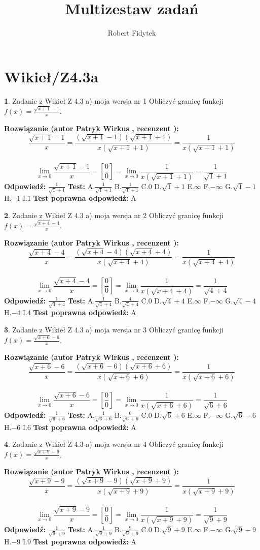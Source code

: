 \documentclass[12pt, a4paper]{article}
\title{Multizestaw zadań}
\author{Robert Fidytek}
\date{}
\theoremstyle{definition} %
\newtheorem{zad}{}
\newcommand{\kategoria}[1]{\section{#1}}
\newcommand{\zadStart}[1]{\begin{zad}#1\newline}
\newcommand{\zadStop}{\end{zad}}
\newcommand{\rozwStart}[2]{\noindent \textbf{Rozwiązanie (autor #1 , recenzent #2): }\newline}
\newcommand{\rozwStop}{\newline}
\newcommand{\odpStart}{\noindent \textbf{Odpowiedź:}\newline}
\newcommand{\odpStop}{\newline}
\newcommand{\testStart}{\noindent \textbf{Test:}\newline}
\newcommand{\testStop}{\newline}
\newcommand{\kluczStart}{\noindent \textbf{Test poprawna odpowiedź:}\newline}
\newcommand{\kluczStop}{\newline}
\begin{document}
\maketitle

\kategoria{Wikieł/Z4.3a}


\zadStart{Zadanie z Wikieł Z 4.3 a) moja wersja nr 1}
Obliczyć granicę funkcji $f(x)=\frac{\sqrt{x+1}-1}{x}$.
\zadStop
\rozwStart{Patryk Wirkus}{}
$$\frac{\sqrt{x+1}-1}{x}=\frac{(\sqrt{x+1}-1)(\sqrt{x+1}+1)}{x(\sqrt{x+1}+1)}=\frac{1}{x(\sqrt{x+1}+1)}$$
\\
$$\lim\limits_{x\to0}\frac{\sqrt{x+1}-1}{x}=[\frac{0}{0}]=
\lim\limits_{x\to0}\frac{1}{x(\sqrt{x+1}+1)} = \frac{1}{\sqrt{1}+1}$$
\rozwStop
\odpStart
$\frac{1}{\sqrt{1}+1}$
\odpStop
\testStart
A.$\frac{1}{\sqrt{1}+1}$
B.$\frac{1}{\sqrt{1}+1}$
C.$0$
D.$\sqrt{1}+1$
E.$\infty$
F.$-\infty$
G.$\sqrt{1}-1$
H.$-1$
I.$1$
\testStop
\kluczStart
A
\kluczStop



\zadStart{Zadanie z Wikieł Z 4.3 a) moja wersja nr 2}
Obliczyć granicę funkcji $f(x)=\frac{\sqrt{x+4}-4}{x}$.
\zadStop
\rozwStart{Patryk Wirkus}{}
$$\frac{\sqrt{x+4}-4}{x}=\frac{(\sqrt{x+4}-4)(\sqrt{x+4}+4)}{x(\sqrt{x+4}+4)}=\frac{1}{x(\sqrt{x+4}+4)}$$
\\
$$\lim\limits_{x\to0}\frac{\sqrt{x+4}-4}{x}=[\frac{0}{0}]=
\lim\limits_{x\to0}\frac{1}{x(\sqrt{x+4}+4)} = \frac{1}{\sqrt{4}+4}$$
\rozwStop
\odpStart
$\frac{1}{\sqrt{4}+4}$
\odpStop
\testStart
A.$\frac{1}{\sqrt{4}+4}$
B.$\frac{4}{\sqrt{4}+4}$
C.$0$
D.$\sqrt{4}+4$
E.$\infty$
F.$-\infty$
G.$\sqrt{4}-4$
H.$-4$
I.$4$
\testStop
\kluczStart
A
\kluczStop



\zadStart{Zadanie z Wikieł Z 4.3 a) moja wersja nr 3}
Obliczyć granicę funkcji $f(x)=\frac{\sqrt{x+6}-6}{x}$.
\zadStop
\rozwStart{Patryk Wirkus}{}
$$\frac{\sqrt{x+6}-6}{x}=\frac{(\sqrt{x+6}-6)(\sqrt{x+6}+6)}{x(\sqrt{x+6}+6)}=\frac{1}{x(\sqrt{x+6}+6)}$$
\\
$$\lim\limits_{x\to0}\frac{\sqrt{x+6}-6}{x}=[\frac{0}{0}]=
\lim\limits_{x\to0}\frac{1}{x(\sqrt{x+6}+6)} = \frac{1}{\sqrt{6}+6}$$
\rozwStop
\odpStart
$\frac{1}{\sqrt{6}+6}$
\odpStop
\testStart
A.$\frac{1}{\sqrt{6}+6}$
B.$\frac{6}{\sqrt{6}+6}$
C.$0$
D.$\sqrt{6}+6$
E.$\infty$
F.$-\infty$
G.$\sqrt{6}-6$
H.$-6$
I.$6$
\testStop
\kluczStart
A
\kluczStop



\zadStart{Zadanie z Wikieł Z 4.3 a) moja wersja nr 4}
Obliczyć granicę funkcji $f(x)=\frac{\sqrt{x+9}-9}{x}$.
\zadStop
\rozwStart{Patryk Wirkus}{}
$$\frac{\sqrt{x+9}-9}{x}=\frac{(\sqrt{x+9}-9)(\sqrt{x+9}+9)}{x(\sqrt{x+9}+9)}=\frac{1}{x(\sqrt{x+9}+9)}$$
\\
$$\lim\limits_{x\to0}\frac{\sqrt{x+9}-9}{x}=[\frac{0}{0}]=
\lim\limits_{x\to0}\frac{1}{x(\sqrt{x+9}+9)} = \frac{1}{\sqrt{9}+9}$$
\rozwStop
\odpStart
$\frac{1}{\sqrt{9}+9}$
\odpStop
\testStart
A.$\frac{1}{\sqrt{9}+9}$
B.$\frac{9}{\sqrt{9}+9}$
C.$0$
D.$\sqrt{9}+9$
E.$\infty$
F.$-\infty$
G.$\sqrt{9}-9$
H.$-9$
I.$9$
\testStop
\kluczStart
A
\kluczStop
\end{document}
